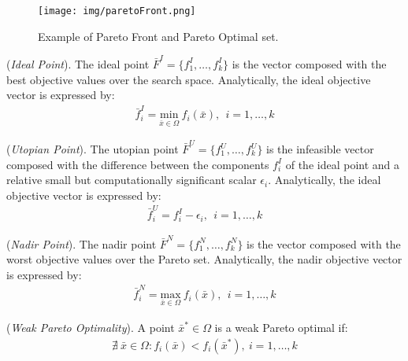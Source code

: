 %
\begin{figure}[htbp]
	\centerline{\texttt{[image: img/paretoFront.png]}}
	\caption{Example of Pareto Front and Pareto Optimal set.}
	\label{fig_paretofront}
\end{figure}
%
\theoremstyle{definition}
\begin{definition}{(\textit{Ideal Point}).}\label{defC6}
The ideal point $\bar F^I = \{ f^I_1, \ldots , f^I_k\}$ is the vector composed with the best objective values over the search space. Analytically, the ideal objective vector is expressed by: 
%
\begin{equation} \label{equation120}
  \begin{aligned}
    \bar f^I_i = \underset{\bar x \in \Omega}{\text{min}} \ f_i(\bar x), \ \ i = 1, \ldots , k
\end{aligned}
\end{equation}
%
\end{definition}
%
\theoremstyle{definition}
\begin{definition}{(\textit{Utopian Point}).}\label{defC7}
The utopian point $\bar F^U = \{ f^U_1, \ldots , f^U_k\}$ is the infeasible vector composed with the difference between the components $f^I_i$ of the ideal point and a relative small but computationally significant scalar $\epsilon_i$. Analytically, the ideal objective vector is expressed by: 
%
\begin{equation} \label{equation121}
  \begin{aligned}
    \bar f^U_i = f^I_i - \epsilon_i, \ \ i = 1, \ldots , k
\end{aligned}
\end{equation}
%
\end{definition}
%
\theoremstyle{definition}
\begin{definition}{(\textit{Nadir Point}).}\label{defC8}
The nadir point $\bar F^N = \{ f^N_1, \ldots , f^N_k\}$ is the vector composed with the worst objective values over the Pareto set. Analytically, the nadir objective vector is expressed by: 
%
\begin{equation} \label{equation122}
  \begin{aligned}
    \bar f^N_i = \underset{\bar x \in \Omega}{\text{max}} \ f_i(\bar x), \ \ i = 1, \ldots , k
\end{aligned}
\end{equation}
%
\end{definition}
%
\theoremstyle{definition}
\begin{definition}{(\textit{Weak Pareto Optimality}).}\label{defC9}
A point $\bar x^\ast \in \Omega$ is a weak Pareto optimal if: 
%
\begin{equation} \label{equation123}
  \begin{aligned}
    \nexists \ \bar x \in \Omega : f_i(\bar x) < f_i(\bar x^\ast), \ i = 1, \ldots , k
\end{aligned}
\end{equation}
%
\end{definition}
